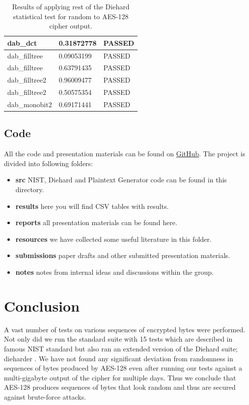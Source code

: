 \documentclass[conference]{IEEEtran}
\begin{document}
\begin{center}
\begin{table}
\begin{tabular}{|l|l|l|}
dab\_dct                               & 0.31872778 & PASSED \\ \hline
dab\_filltree                          & 0.09053199 & PASSED \\ \hline
dab\_filltree                          & 0.63791435 & PASSED \\ \hline
dab\_filltree2                         & 0.96009477 & PASSED \\ \hline
dab\_filltree2                         & 0.50575354 & PASSED \\ \hline
dab\_monobit2                          & 0.69171441 & PASSED \\ \hline
\end{tabular}
\caption{Results of applying rest of the Diehard statistical test for random to AES-128 cipher output.}
\label{dieharderesults3}
\end{table}
\end{center}

\subsection{Code}
All the code and presentation materials can be found on \href{https://urlzs.com/kUsF}{GitHub}. The project is divided into following folders:

\begin{itemize}
  \item \textbf{src} NIST, Diehard and Plaintext Generator code can be found in this directory.
  \item \textbf{results} here you will find CSV tables with results.
  \item \textbf{reports} all presentation materials can be found here.
  \item \textbf{resources} we have collected some useful literature in this folder.
  \item \textbf{submissions} paper drafts and other submitted presentation materials.
   \item \textbf{notes} notes from internal ideas and discussions within the group. 
\end{itemize}

\section{Conclusion}
A vast number of tests on various sequences of encrypted bytes were performed. Not only did we run the standard suite with 15 tests which are described in famous NIST standard \cite{nisttests} but also ran an extended version of the Diehard suite; dieharder \cite{diehardtests}. We have not found any significant deviation from randomness in sequences  of bytes produced by AES-128 even after running our tests against a multi-gigabyte output of the cipher for multiple days. Thus we conclude that AES-128 produces sequences of bytes that look random and thus are secured against brute-force attacks. 
\end{document}
